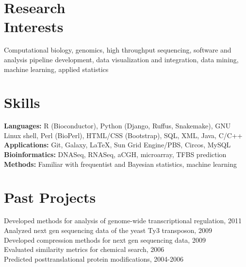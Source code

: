 \documentclass[margin,line]{res}
\begin{document}
\begin{resume}
\section{Research\\Interests}
Computational biology, genomics, high throughput sequencing, software and analysis pipeline development, data visualization and integration, data mining, machine learning, applied statistics

\section{Skills} 
\textbf{Languages:} R (Bioconductor), Python (Django, Ruffus, Snakemake), GNU Linux shell, Perl (BioPerl), HTML/CSS (Bootstrap), SQL, XML, Java, C/C++\\
\textbf{Applications:} Git, Galaxy, \LaTeX, Sun Grid Engine/PBS, Circos, MySQL\\
\textbf{Bioinformatics:} DNASeq, RNASeq, aCGH, microarray, TFBS prediction\\
\textbf{Methods:} Familiar with frequentist and Bayesian statistics, machine learning


\section{Past Projects}
Developed methods for analysis of genome-wide transcriptional regulation, 2011 \\
Analyzed next gen sequencing data of the yeast Ty3 transposon, 2009\\
Developed compression methods for next gen sequencing data, 2009 \\
Evaluated similarity metrics for chemical search, 2006\\
Predicted posttranslational protein modifications, 2004-2006


\end{resume}
\end{document}

